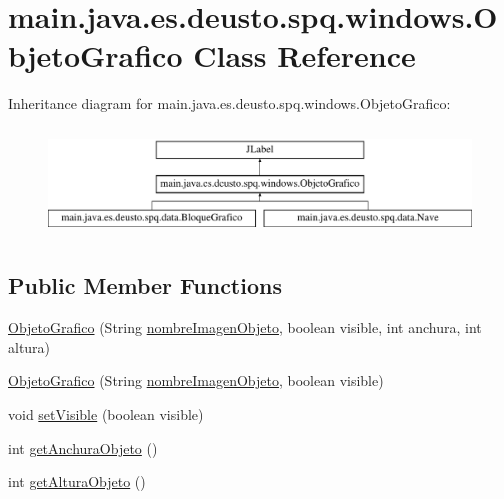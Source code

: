 \hypertarget{classmain_1_1java_1_1es_1_1deusto_1_1spq_1_1windows_1_1_objeto_grafico}{}\section{main.\+java.\+es.\+deusto.\+spq.\+windows.\+Objeto\+Grafico Class Reference}
\label{classmain_1_1java_1_1es_1_1deusto_1_1spq_1_1windows_1_1_objeto_grafico}
Inheritance diagram for main.\+java.\+es.\+deusto.\+spq.\+windows.\+Objeto\+Grafico\+:\begin{figure}[H]
\begin{center}
\leavevmode
\includegraphics[height=2.896552cm]{classmain_1_1java_1_1es_1_1deusto_1_1spq_1_1windows_1_1_objeto_grafico}
\end{center}
\end{figure}
\subsection*{Public Member Functions}
\begin{DoxyCompactItemize}
\item 
\hyperlink{classmain_1_1java_1_1es_1_1deusto_1_1spq_1_1windows_1_1_objeto_grafico_a7145bbe2008b90d921197df64f2c5419}{Objeto\+Grafico} (String \hyperlink{classmain_1_1java_1_1es_1_1deusto_1_1spq_1_1windows_1_1_objeto_grafico_aaf5e1e8c4ebff8a39c72b07c8af6ca86}{nombre\+Imagen\+Objeto}, boolean visible, int anchura, int altura)
\item 
\hyperlink{classmain_1_1java_1_1es_1_1deusto_1_1spq_1_1windows_1_1_objeto_grafico_ae202df29f4ef2c92f619da2a21e1f60d}{Objeto\+Grafico} (String \hyperlink{classmain_1_1java_1_1es_1_1deusto_1_1spq_1_1windows_1_1_objeto_grafico_aaf5e1e8c4ebff8a39c72b07c8af6ca86}{nombre\+Imagen\+Objeto}, boolean visible)
\item 
void \hyperlink{classmain_1_1java_1_1es_1_1deusto_1_1spq_1_1windows_1_1_objeto_grafico_a6fd4a42a5bb4d836307a8b1f43b87ab4}{set\+Visible} (boolean visible)
\item 
int \hyperlink{classmain_1_1java_1_1es_1_1deusto_1_1spq_1_1windows_1_1_objeto_grafico_af9a411491d0da60af2c25f1eb32ee13d}{get\+Anchura\+Objeto} ()
\item 
int \hyperlink{classmain_1_1java_1_1es_1_1deusto_1_1spq_1_1windows_1_1_objeto_grafico_a27282110d7d80eb3ba6adbf920fa614f}{get\+Altura\+Objeto} ()
\end{DoxyCompactItemize}
